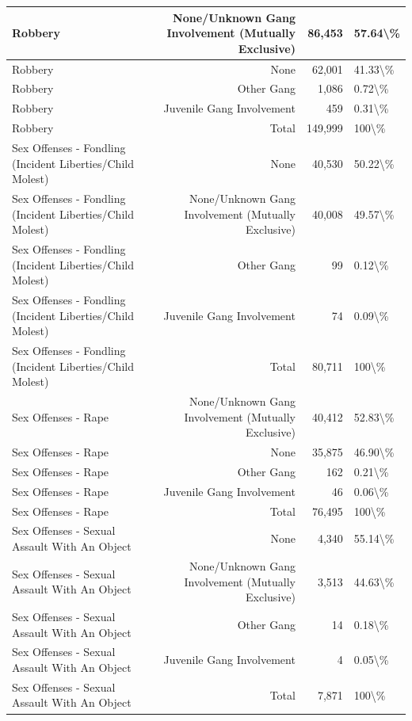 \documentclass[
]{krantz}
\begin{document}
\begin{longtable}[t]{l|r|r|l}
\hline
Robbery & None/Unknown Gang Involvement (Mutually Exclusive) & 86,453 & 57.64\textbackslash{}\%\\
\hline
Robbery & None & 62,001 & 41.33\textbackslash{}\%\\
\hline
Robbery & Other Gang & 1,086 & 0.72\textbackslash{}\%\\
\hline
Robbery & Juvenile Gang Involvement & 459 & 0.31\textbackslash{}\%\\
\hline
Robbery & Total & 149,999 & 100\textbackslash{}\%\\
\hline
Sex Offenses - Fondling (Incident Liberties/Child Molest) & None & 40,530 & 50.22\textbackslash{}\%\\
\hline
Sex Offenses - Fondling (Incident Liberties/Child Molest) & None/Unknown Gang Involvement (Mutually Exclusive) & 40,008 & 49.57\textbackslash{}\%\\
\hline
Sex Offenses - Fondling (Incident Liberties/Child Molest) & Other Gang & 99 & 0.12\textbackslash{}\%\\
\hline
Sex Offenses - Fondling (Incident Liberties/Child Molest) & Juvenile Gang Involvement & 74 & 0.09\textbackslash{}\%\\
\hline
Sex Offenses - Fondling (Incident Liberties/Child Molest) & Total & 80,711 & 100\textbackslash{}\%\\
\hline
Sex Offenses - Rape & None/Unknown Gang Involvement (Mutually Exclusive) & 40,412 & 52.83\textbackslash{}\%\\
\hline
Sex Offenses - Rape & None & 35,875 & 46.90\textbackslash{}\%\\
\hline
Sex Offenses - Rape & Other Gang & 162 & 0.21\textbackslash{}\%\\
\hline
Sex Offenses - Rape & Juvenile Gang Involvement & 46 & 0.06\textbackslash{}\%\\
\hline
Sex Offenses - Rape & Total & 76,495 & 100\textbackslash{}\%\\
\hline
Sex Offenses - Sexual Assault With An Object & None & 4,340 & 55.14\textbackslash{}\%\\
\hline
Sex Offenses - Sexual Assault With An Object & None/Unknown Gang Involvement (Mutually Exclusive) & 3,513 & 44.63\textbackslash{}\%\\
\hline
Sex Offenses - Sexual Assault With An Object & Other Gang & 14 & 0.18\textbackslash{}\%\\
\hline
Sex Offenses - Sexual Assault With An Object & Juvenile Gang Involvement & 4 & 0.05\textbackslash{}\%\\
\hline
Sex Offenses - Sexual Assault With An Object & Total & 7,871 & 100\textbackslash{}\%\\

\end{longtable}
\end{document}
